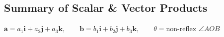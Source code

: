 \documentclass[a4paper]{book}
\newcommand{\vv}[1]{\overrightarrow{#1}}
\newcommand{\cv}[2]{\begin{pmatrix}#1\\#2\end{pmatrix}}
\begin{document}
\clearpage
\subsection{Summary of Scalar \& Vector Products}
\begingroup
\renewcommand{\vv}[1]{\mathbf{#1}}%
\renewcommand{\cv}[3]{\begin{pmatrix}#1\\#2\\#3\end{pmatrix}}%
\newcommand{\pmsidenote}[1]{{\small\textcolor{gray}{#1}}}%
\let\sidenote\pmsidenote
\newcommand{\topdisplay}[1]{\par\noindent\hfill$\displaystyle #1$\hfill\null\par\smallskip}%
\renewcommand{\hl}[1]{#1}%
\providecommand{\vab}[1]{\overrightarrow{#1}}%
%
\renewenvironment{theorem}[2][]{%
  \begin{tcolorbox}[enhanced, before skip=2mm, after skip=2mm,
    colback=black!5!white,colframe=black,fonttitle=\bfseries,title={#2},#1]}{\end{tcolorbox}}%
\topdisplay{\vv a=a_1\vv i+a_2\vv j+a_3\vv k,\qquad \vv b=b_1\vv i+b_2\vv j+b_3\vv k,\qquad\theta=\text{non-reflex }\angle AOB}
\end{document}
